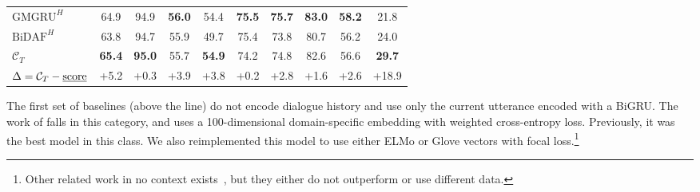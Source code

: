 \begin{table}[!htp]
\begin{center}
{\begin{tabular}{lccccccccc}
$\text{GMGRU}^{H}$                             & 64.9                 & 94.9                 & {\bf 56.0}           & 54.4             & {\bf 75.5}       & {\bf 75.7}       & {\bf 83.0}       & {\bf 58.2}       & 21.8             \\
$\text{BiDAF}^{H}$                             & 63.8                 & 94.7                 & 55.9                 & 49.7             & 75.4             & 73.8             & 80.7             & 56.2             & 24.0             \\ \midrule
$\mathcal{C}_{T}$                              & {\bf 65.4}           & {\bf 95.0}           & 55.7                 & {\bf 54.9}       & 74.2             & 74.8             & 82.6             & 56.6             & {\bf 29.7}       \\
$\Delta=\mathcal{C}_{T} - \text{\underline{score}}$ & {\footnotesize +5.2} & {\footnotesize +0.3} & {\footnotesize +3.9} & {\footnotesize +3.8} & {\footnotesize +0.2} & {\footnotesize +2.8} & {\footnotesize +1.6} & {\footnotesize +2.6} & {\footnotesize +18.9}                                                                                                \\ \bottomrule
\end{tabular}}
\end{center}
\end{table}

The first set of baselines (above the line) do not encode dialogue
history and use only the current utterance encoded with a BiGRU. The
work of \citet{xiao2016behavioral} falls in this category, and uses a
100-dimensional domain-specific embedding with weighted cross-entropy
loss. Previously, it was the best model in this class. We also
reimplemented this model to use either ELMo or Glove vectors with
focal loss.\footnote{Other related work in no context
  exists~\cite[\eg,][]{perez2017predicting, gibson2017attention}, but
  they either do not outperform \cite{xiao2016behavioral} or use
  different data.}

